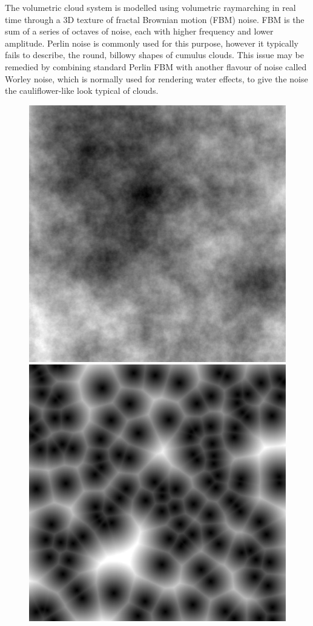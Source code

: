 \documentclass[10pt, openany]{book}
\begin{document}
The volumetric cloud system is modelled using volumetric raymarching in real time through a 3D texture of fractal Brownian motion (FBM) noise. FBM is the sum of a series of octaves of noise, each with higher frequency and lower amplitude. Perlin noise is commonly used for this purpose, however it typically fails to describe, the round, billowy shapes of cumulus clouds. This issue may be remedied by combining standard Perlin FBM with another flavour of noise called Worley noise, which is normally used for rendering water effects, to give the noise the cauliflower-like look typical of clouds. \citep{gpupro7} 

\begin{figure}[H]
\centering
\begin{minipage}{.3\textwidth}
  \centering
  \includegraphics[width=.6\linewidth]{fbm}
\end{minipage}%
\begin{minipage}{.3\textwidth}
  \centering
  \includegraphics[width=.6\linewidth]{worley}
\end{minipage}%

\end{figure}
\end{document}
